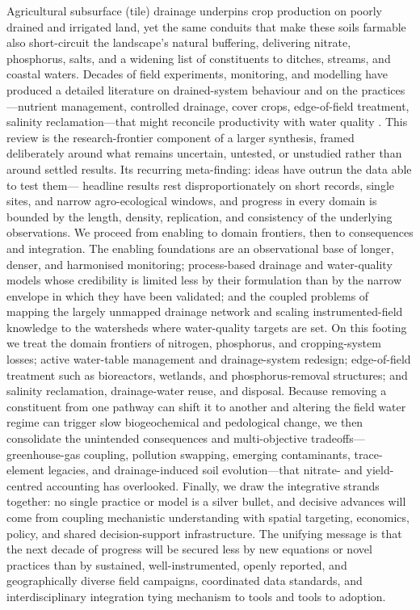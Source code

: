 Agricultural subsurface (tile) drainage underpins crop production on poorly drained and irrigated land, yet the same conduits that make these soils farmable also short-circuit the landscape's natural buffering, delivering nitrate, phosphorus, salts, and a widening list of constituents to ditches, streams, and coastal waters. Decades of field experiments, monitoring, and modelling have produced a detailed literature on drained-system behaviour and on the practices---nutrient management, controlled drainage, cover crops, edge-of-field treatment, salinity reclamation---that might reconcile productivity with water quality \parencite{Randall2001}. This review is the research-frontier component of a larger synthesis, framed deliberately around what remains uncertain, untested, or unstudied rather than around settled results. Its recurring meta-finding: ideas have outrun the data able to test them--- headline results rest disproportionately on short records, single sites, and narrow agro-ecological windows, and progress in every domain is bounded by the length, density, replication, and consistency of the underlying observations. We proceed from enabling to domain frontiers, then to consequences and integration. The enabling foundations are an observational base of longer, denser, and harmonised monitoring; process-based drainage and water-quality models whose credibility is limited less by their formulation than by the narrow envelope in which they have been validated; and the coupled problems of mapping the largely unmapped drainage network and scaling instrumented-field knowledge to the watersheds where water-quality targets are set. On this footing we treat the domain frontiers of nitrogen, phosphorus, and cropping-system losses; active water-table management and drainage-system redesign; edge-of-field treatment such as bioreactors, wetlands, and phosphorus-removal structures; and salinity reclamation, drainage-water reuse, and disposal. Because removing a constituent from one pathway can shift it to another and altering the field water regime can trigger slow biogeochemical and pedological change, we then consolidate the unintended consequences and multi-objective tradeoffs---greenhouse-gas coupling, pollution swapping, emerging contaminants, trace-element legacies, and drainage-induced soil evolution---that nitrate- and yield-centred accounting has overlooked. Finally, we draw the integrative strands together: no single practice or model is a silver bullet, and decisive advances will come from coupling mechanistic understanding with spatial targeting, economics, policy, and shared decision-support infrastructure. The unifying message is that the next decade of progress will be secured less by new equations or novel practices than by sustained, well-instrumented, openly reported, and geographically diverse field campaigns, coordinated data standards, and interdisciplinary integration tying mechanism to tools and tools to adoption.